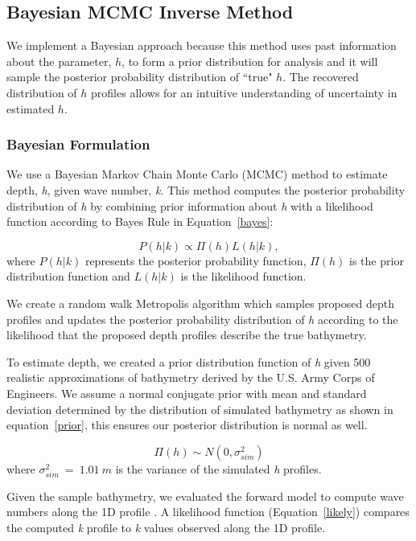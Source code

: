 \subsection{Bayesian MCMC Inverse Method}
We implement a Bayesian approach because this method uses past information about the parameter, $h$, to form a prior distribution for analysis and it will sample the posterior probability distribution of ``true" $h$. The recovered distribution of $h$ profiles allows for an intuitive understanding of uncertainty in estimated $h$.

\subsubsection{Bayesian Formulation}

We use a Bayesian Markov Chain Monte Carlo (MCMC) method to estimate depth, \textit{h}, given wave number, \textit{k}. %
This method computes the posterior probability distribution of \textit{h} by combining prior information about \textit{h} with a likelihood function according to Bayes Rule in Equation~\ref{bayes}: 


\begin{equation}\label{bayes}
P(h|%
k) \propto \Pi(h)L(h|%
k),
\end{equation} 
where $P(h|%
k)$ represents the posterior probability function, $\Pi(h)$ is the prior distribution function and $L(h|%
k)$ is the likelihood function.

We create a random walk Metropolis algorithm \citep{Metropolis1953} which samples proposed depth profiles and updates the posterior probability distribution of \textit{h} according to the likelihood that the proposed depth profiles describe the true bathymetry. 

To estimate depth, we created a prior distribution function of \textit{h} given 500 realistic approximations of bathymetry derived by the U.S. Army Corps of Engineers.  We assume a normal conjugate prior with mean and standard deviation determined by the distribution of simulated bathymetry as shown in equation~\ref{prior}, this ensures our posterior distribution is normal as well. 

\begin{equation}\label{prior}
\Pi(h) \sim N(0,\sigma_{sim}^2)
\end{equation}
where $\sigma_{sim}^2~=~1.01~m$ is the variance of the simulated \textit{h} profiles. 

Given the sample bathymetry, we evaluated the forward model to compute wave numbers along the 1D profile%
. A likelihood function (Equation~\ref{likely}) compares the computed \textit{k} profile to \textit{k} values observed along the 1D profile. 

